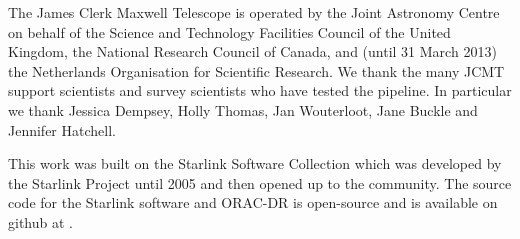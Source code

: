 \documentclass[final,authoryear,5p,times,twocolumn]{elsarticle}
\begin{document}
The James Clerk Maxwell Telescope is operated by the Joint Astronomy
Centre on behalf of the Science and Technology Facilities Council of
the United Kingdom, the National Research Council of Canada, and
(until 31 March 2013) the Netherlands Organisation for Scientific
Research. We thank the many JCMT support scientists and survey
scientists who have tested the pipeline. In particular we thank
Jessica Dempsey, Holly Thomas, Jan Wouterloot, Jane Buckle and
Jennifer Hatchell.

This work was built on the Starlink Software Collection which was
developed by the Starlink Project until 2005
\citep{1982QJRAS..23..485D,2005ASPC..347...22D,2008ASPC..394..650C}
and then opened up to the community. The source code for the Starlink
software \citep{2011ascl.soft10012V} and ORAC-DR is open-source and is
available on github at
.



\end{document}
